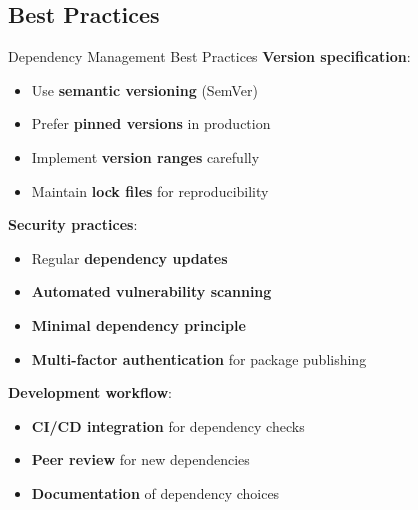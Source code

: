 \documentclass{beamer}
\begin{document}
\subsection{Best Practices}

\begin{frame}[t]{Dependency Management Best Practices}
\textbf{Version specification}:
\begin{itemize}
\item Use \textbf{semantic versioning} (SemVer)
\item Prefer \textbf{pinned versions} in production
\item Implement \textbf{version ranges} carefully
\item Maintain \textbf{lock files} for reproducibility
\end{itemize}

\bigskip

\textbf{Security practices}:
\begin{itemize}
\item Regular \textbf{dependency updates}
\item \textbf{Automated vulnerability scanning}
\item \textbf{Minimal dependency principle}
\item \textbf{Multi-factor authentication} for package publishing
\end{itemize}

\bigskip

\textbf{Development workflow}:
\begin{itemize}
\item \textbf{CI/CD integration} for dependency checks
\item \textbf{Peer review} for new dependencies
\item \textbf{Documentation} of dependency choices
\end{itemize}
\end{frame}
\end{document}
